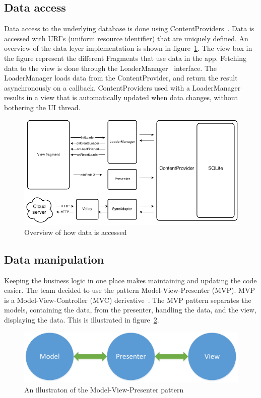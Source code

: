 \subsection{Data access}
Data access to the underlying database is done using ContentProviders~\cite{contentproviders}. Data is accessed with \gls{URI}'s (uniform resource identifier) that are uniquely defined. An overview of the data leyer implementation is shown in figure~\ref{fig:archAppOverview}. The view box in the figure represent the different Fragments that use data in the app. Fetching data to the view is done through the LoaderManager~\cite{loadermanager} interface. The LoaderManager loads data from the ContentProvider, and return the result asynchronously on a callback. ContentProviders used with a LoaderManager results in a view that is automatically updated when data changes, without bothering the UI thread.

\begin{figure}[H]
\includegraphics[width=\textwidth]{ch/architecture/fig/arch_app_overview.png}
\caption{Overview of how data is accessed}
\label{fig:archAppOverview}
\end{figure}

\subsection{Data manipulation}
Keeping the business logic in one place makes maintaining and updating the code easier. The team decided to use the pattern Model-View-Presenter (MVP). MVP is a Model-View-Controller (MVC) derivative~\cite{mvc}. The MVP pattern separates the models, containing the data, from the presenter, handling the data, and the view, displaying the data. This is illustrated in figure~\ref{fig:mvp}. 

\begin{figure}[H]
\includegraphics[width=\textwidth]{ch/architecture/fig/mvp.png}
\caption{An illustraton of the Model-View-Presenter pattern}
\label{fig:mvp}
\end{figure}

